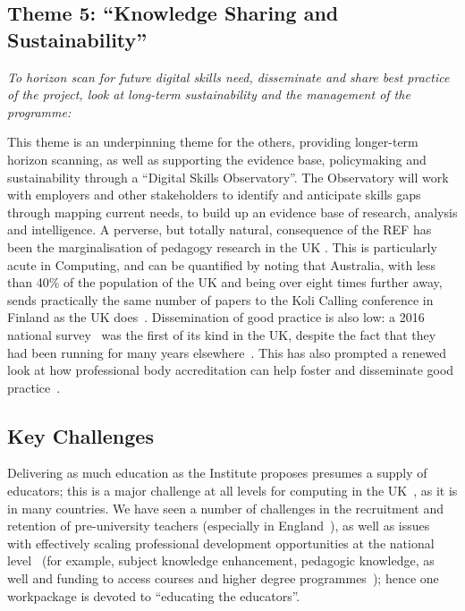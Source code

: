 \documentclass[conference]{IEEEtran}
\begin{document}
\subsection{Theme 5: ``Knowledge Sharing and Sustainability''}

{\emph{To horizon scan for future digital skills need, disseminate and
share best practice of the project, look at long-term sustainability
and the management of the programme:}}\newline

\noindent This theme is an underpinning theme for the others,
providing longer-term horizon scanning, as well as supporting the
evidence base, policymaking and sustainability through a ``Digital
Skills Observatory''. The Observatory will work with employers and
other stakeholders to identify and anticipate skills gaps through
mapping current needs, to build up an evidence base of research,
analysis and intelligence.  A perverse, but totally natural,
consequence of the REF has been the marginalisation of pedagogy
research in the UK \cite{Cottonetal2018a}. This is particularly acute
in Computing, and can be quantified by noting that Australia, with
less than 40\% of the population of the UK and being over eight times
further away, sends practically the same number of papers to the Koli
Calling conference in Finland as the UK
does~\cite{Simon2016a}. Dissemination of good practice is also low: a
2016 national survey~\cite{murphy-et-al:programming2017} was the first
of its kind in the UK, despite the fact that they had been running for
many years elsewhere~\cite{simon-et-al:sigcse2018}. This has also
prompted a renewed look at how professional body accreditation can
help foster and disseminate good practice~\cite{crick-et-al:cep2020}.

\subsection{Key Challenges}

Delivering as much education as the Institute proposes presumes a
supply of educators; this is a major challenge at all levels for
computing in the UK~\cite{brown-et-al:toce2014}, as it is in many
countries. We have seen a number of challenges in the recruitment and
retention of pre-university teachers (especially in
England~\cite{sentance+waite:2018}), as well as issues with
effectively scaling professional development opportunities at the
national level~\cite{sentance+csizmadia:2017} (for example, subject
knowledge enhancement, pedagogic knowledge, as well and funding to
access courses and higher degree
programmes~\cite{sentance-et-al-wipsce2012,moller+crick:jce2018});
hence one workpackage is devoted to ``educating the educators''.
\end{document}
